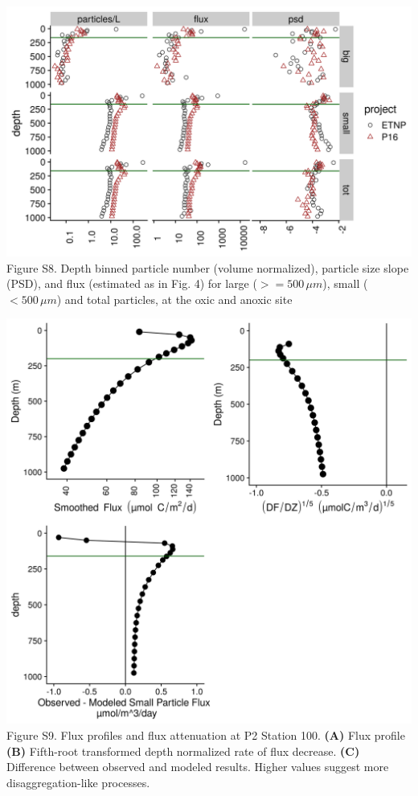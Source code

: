 \documentclass[]{article}
\begin{document}
\includegraphics{../figures/BigVsSmall.png} Figure S8. Depth binned
particle number (volume normalized), particle size slope (PSD), and flux
(estimated as in Fig. 4) for large (\(>= 500\, \mu m\)), small
(\(< 500 \, \mu m\)) and total particles, at the oxic and anoxic site

\includegraphics{../figures/P16FluxRelate.png} Figure S9. Flux profiles
and flux attenuation at P2 Station 100. \textbf{(A)} Flux profile
\textbf{(B)} Fifth-root transformed depth normalized rate of flux
decrease. \textbf{(C)} Difference between observed and modeled results.
Higher values suggest more disaggregation-like processes.
\end{document}
